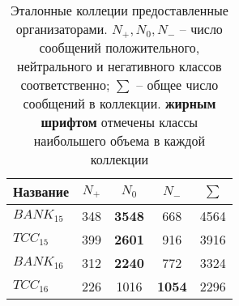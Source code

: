 \begin{table}[htp!]
\caption{Эталонные коллеции предоставленные организаторами.
        {\bf $N_+, N_0, N_-$} -- число сообщений положительного, нейтрального и
        негативного классов соответственно;
        {\bf $\sum$} -- общее число сообщений в коллекции.
        {\bf жирным шрифтом} отмечены классы наибольшего объема в каждой
        коллекции
    }
\label{table:testCollections}
\centering
\begin{tabular}{lcccc}
\hline
\multicolumn{1}{c|}{Название} & \multicolumn{1}{c|}{$N_+$} & \multicolumn{1}{c|}{$N_0$}       & \multicolumn{1}{c|}{$N_-$}      & $\sum$ \\ \hline
$BANK_{15}$                   & 348                        & {\bf 3548}                       & 668                             & 4564   \\
$TCC_{15}$                    & 399                        & {\bf 2601}                       & 916                             & 3916   \\
$BANK_{16}$                   & 312                        & {\bf 2240}                       & 772                             & 3324   \\
$TCC_{16}$                    & 226                        & 1016                             & {\bf 1054}                      & 2296   \\ \hline
\end{tabular}
\end{table}
